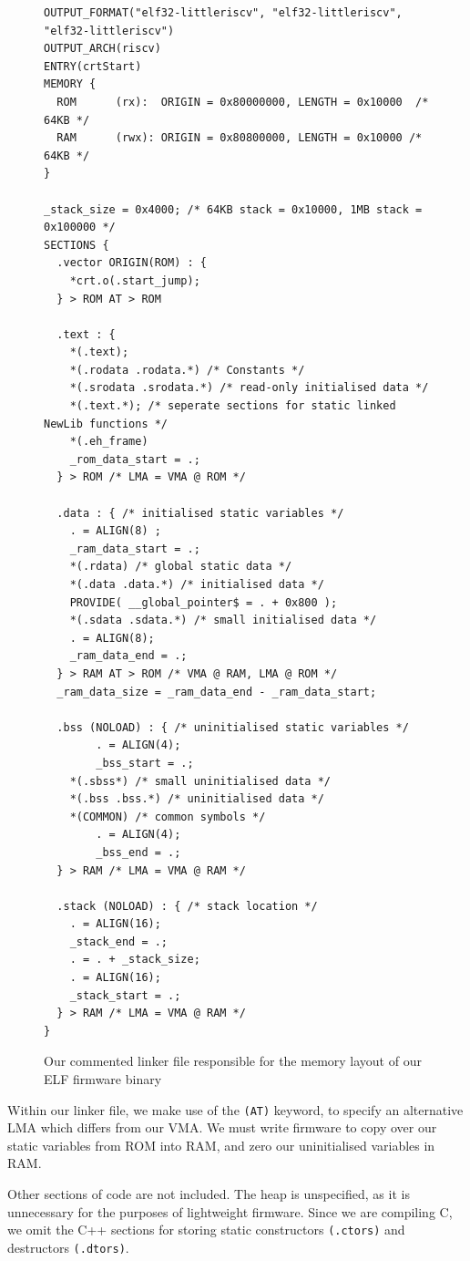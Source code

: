 \documentclass[a4paper,8pt]{report}
\begin{document}
\begin{figure}[h]
  \centering
\scriptsize
\begin{BVerbatim}
OUTPUT_FORMAT("elf32-littleriscv", "elf32-littleriscv", "elf32-littleriscv")
OUTPUT_ARCH(riscv)
ENTRY(crtStart)
MEMORY {
  ROM      (rx):  ORIGIN = 0x80000000, LENGTH = 0x10000  /* 64KB */
  RAM      (rwx): ORIGIN = 0x80800000, LENGTH = 0x10000 /* 64KB */
}

_stack_size = 0x4000; /* 64KB stack = 0x10000, 1MB stack = 0x100000 */
SECTIONS {
  .vector ORIGIN(ROM) : {
    *crt.o(.start_jump);
  } > ROM AT > ROM

  .text : {
    *(.text);
    *(.rodata .rodata.*) /* Constants */
    *(.srodata .srodata.*) /* read-only initialised data */
    *(.text.*); /* seperate sections for static linked NewLib functions */
    *(.eh_frame)
    _rom_data_start = .;
  } > ROM /* LMA = VMA @ ROM */
  
  .data : { /* initialised static variables */
    . = ALIGN(8) ;
    _ram_data_start = .;
    *(.rdata) /* global static data */
    *(.data .data.*) /* initialised data */
    PROVIDE( __global_pointer$ = . + 0x800 );
    *(.sdata .sdata.*) /* small initialised data */
    . = ALIGN(8);
    _ram_data_end = .;
  } > RAM AT > ROM /* VMA @ RAM, LMA @ ROM */
  _ram_data_size = _ram_data_end - _ram_data_start;

  .bss (NOLOAD) : { /* uninitialised static variables */
		. = ALIGN(4);
		_bss_start = .;
    *(.sbss*) /* small uninitialised data */
    *(.bss .bss.*) /* uninitialised data */
    *(COMMON) /* common symbols */
		. = ALIGN(4);
		_bss_end = .;
  } > RAM /* LMA = VMA @ RAM */

  .stack (NOLOAD) : { /* stack location */
    . = ALIGN(16);
    _stack_end = .;
    . = . + _stack_size;
    . = ALIGN(16);
    _stack_start = .;
  } > RAM /* LMA = VMA @ RAM */
}
\end{BVerbatim}
\normalsize
\caption{Our commented linker file responsible for the memory layout of our ELF
  firmware binary}
\end{figure}

Within our linker file, we make use of the \texttt{(AT)} keyword, to specify an
alternative LMA which differs from our VMA. We must write firmware to copy over
our static variables from ROM into RAM, and zero our uninitialised variables in RAM.

Other sections of code are not included. The heap is unspecified, as it is
unnecessary for the purposes of lightweight firmware. Since we are compiling C,
we omit the C++ sections for storing static constructors \texttt{(.ctors)} and
destructors \texttt{(.dtors)}.
\end{document}
